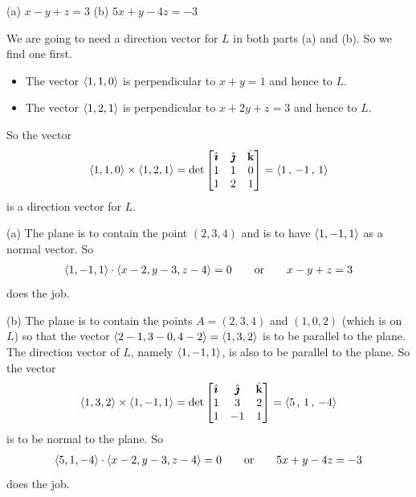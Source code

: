 %

\begin{answer}
(a) $x-y+z=3$\qquad
(b) $5x+y-4z=-3$
\end{answer}

\begin{solution}
We are going to need a direction vector for $L$ in both parts (a) and (b).
So we find one first.
\begin{itemize}
\item
The vector $\left< 1,1,0\right>$ is perpendicular to $x + y = 1$
and hence to $L$.
\item
The vector $\left< 1,2,1\right>$ is perpendicular to $x + 2y + z = 3$
and hence to $L$. 
\end{itemize}
So the vector
\begin{align*}
\left< 1,1,0\right> \times \left< 1,2,1\right>
    =\det\left[\begin{matrix}
            \hat{\pmb{\imath}}  &  \hat{\pmb{\jmath}}  &  \hat{\mathbf{k}} \\
            1    &   1   &   0 \\
            1    &   2   &    1 
            \end{matrix}\right]
=\left< 1 \,,\, -1 \,,\, 1 \right>
\end{align*}
is a direction vector for $L$.

(a) The plane is to contain the point $(2,3,4)$ and is to have 
$\left< 1,-1,1 \right>$ as a normal vector. So
\begin{align*}
\left< 1, -1, 1 \right>\cdot \left< x-2,y-3,z-4 \right> =0\qquad\text{or}\qquad
x-y+z=3
\end{align*}
does the job.

(b) The plane is to contain the points $A=(2,3,4)$ and $(1,0,2)$
(which is on $L$) so that the vector $ \left< 2-1,3-0,4-2 \right>
=\left< 1,3,2 \right>$ is to be parallel to the plane. The direction
vector of $L$, namely $\left<  1 , -1 , 1 \right>$, is also to be parallel 
to the plane. So the vector 
\begin{align*}
\left< 1,3,2\right> \times \left<  1,-1,1\right>
    =\det\left[\begin{matrix}
            \hat{\pmb{\imath}}  &  \hat{\pmb{\jmath}}  &  \hat{\mathbf{k}} \\
            1    &   3   &   2 \\
            1    &  -1   &   1 
            \end{matrix}\right]
=\left<  5 \,,\,  1 \,,\, -4 \right>
\end{align*}
is to be normal to the plane. So
\begin{align*}
\left< 5, 1, -4 \right>\cdot \left< x-2,y-3,z-4 \right> =0\qquad\text{or}\qquad
5x+y-4z=-3
\end{align*}
does the job.
\end{solution}

